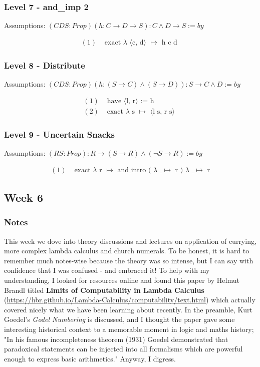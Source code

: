 \documentclass{article}
\theoremstyle{theorem}
\theoremstyle{definition}
\theoremstyle{remark}
\begin{document}
\subsubsection*{Level 7 - and\_imp 2}
Assumptions: $(C D S: Prop) (h : C \rightarrow D \rightarrow S) : C \wedge D \rightarrow S := by$

\[
\begin{aligned}
  (1)& \text{ exact } \lambda \text{ ⟨c, d⟩ } \mapsto \text{ h c d }
\end{aligned}
\]

\subsubsection*{Level 8 - Distribute}
Assumptions: $(C D S : Prop) (h : (S \rightarrow C) \wedge (S \rightarrow D)) : S \rightarrow C \wedge D := by$

\[
\begin{aligned}
  (1)& \text{ have ⟨l, r⟩ := h}\\
  (2)& \text{ exact } \lambda \text{ s } \mapsto \text{ ⟨l s, r s⟩ }
\end{aligned}
\]

\subsubsection*{Level 9 - Uncertain Snacks}
Assumptions: $(R S : Prop) : R \rightarrow (S \rightarrow R) \wedge (\neg S \rightarrow R) := by$

\[
\begin{aligned}
  (1)& \text{ exact } \lambda \text{ r } \mapsto \text{ and\_intro ( } \lambda \text{ \_ } \mapsto \text{ r ) } \lambda \text{ \_ } \mapsto \text{ r}
\end{aligned}
\]

\subsection{Week 6}

\subsubsection*{Notes} This week we dove into theory discussions and lectures on application of currying, more complex lambda calculus and church numerals. To be honest, it is hard to remember much notes-wise because the theory was so intense, but I can say with confidence that I was confused - and embraced it! To help with my understanding, I looked for resources online and found this paper by Helmut Brandl titled \textbf{Limits of Computability in Lambda Calculus} (\url{https://hbr.github.io/Lambda-Calculus/computability/text.html}) which actually covered nicely what we have been learning about recently. In the preamble, Kurt Goedel's \textit{Godel Numbering} is discussed, and I thought the paper gave some interesting historical context to a memorable moment in logic and maths history; "In his famous incompleteness theorem (1931) Goedel demonstrated that paradoxical statements can be injected into all formalisms which are powerful enough to express basic arithmetics." Anyway, I digress. 
\end{document}
